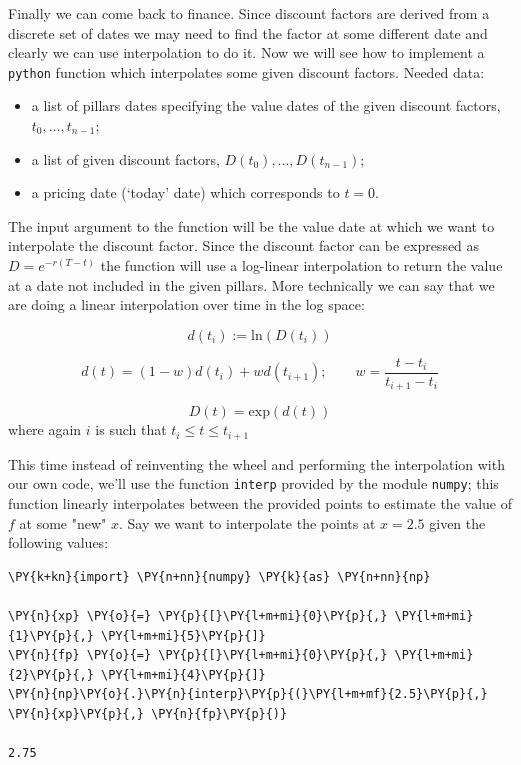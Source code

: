 Finally we can come back to finance. Since discount factors are derived from a discrete set of dates we may need to find the factor at some different date and clearly we can use interpolation to do it.
Now we will see how to implement a \texttt{python} function which interpolates some given discount factors.
Needed data:

\begin{itemize}
\tightlist
\item a list of pillars dates specifying the value dates of the given discount factors, \(t_0,...,t_{n-1}\);
\item a list of given discount factors, \(D(t_0),...,D(t_{n-1})\);
\item a pricing date (`today' date) which corresponds to \(t=0\).
\end{itemize}

The input argument to the function will be the value date at which we want to interpolate the discount factor. Since the discount factor can be expressed as \(D=e^{-r(T-t)}\) the function will use a log-linear interpolation to return the value at a date not included in the given pillars.
More technically we can say that we are doing a linear interpolation over time in the log space:

\[d(t_i):=\mathrm{ln}(D(t_i))\]

\[d(t) = (1-w)d(t_i) + wd(t_{i+1});\qquad w=\frac{t-t_i}{t_{i+1}-t_i}\]

\[D(t) = \mathrm{exp}(d(t))\]
where again \(i\) is such that \(t_i \le t \le t_{i+1}\)

This time instead of reinventing the wheel and performing the interpolation with our own code, we'll use the function \texttt{interp} provided by the module \texttt{numpy}; this function linearly interpolates between the provided points to estimate the value of $f$ at some "new" $x$.
Say we want to interpolate the points at $x = 2.5$ given the following values:

\begin{tcolorbox}[breakable, size=fbox, boxrule=1pt, pad at break*=1mm,colback=cellbackground, colframe=cellborder]
\begin{Verbatim}[commandchars=\\\{\}]
\PY{k+kn}{import} \PY{n+nn}{numpy} \PY{k}{as} \PY{n+nn}{np}

\PY{n}{xp} \PY{o}{=} \PY{p}{[}\PY{l+m+mi}{0}\PY{p}{,} \PY{l+m+mi}{1}\PY{p}{,} \PY{l+m+mi}{5}\PY{p}{]}
\PY{n}{fp} \PY{o}{=} \PY{p}{[}\PY{l+m+mi}{0}\PY{p}{,} \PY{l+m+mi}{2}\PY{p}{,} \PY{l+m+mi}{4}\PY{p}{]}
\PY{n}{np}\PY{o}{.}\PY{n}{interp}\PY{p}{(}\PY{l+m+mf}{2.5}\PY{p}{,} \PY{n}{xp}\PY{p}{,} \PY{n}{fp}\PY{p}{)}

2.75
\end{Verbatim}
\end{tcolorbox}

